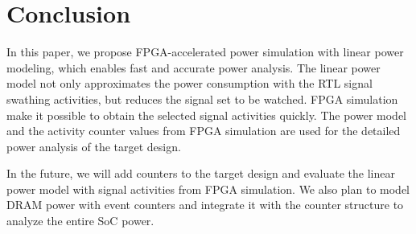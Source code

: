 \section{Conclusion}
In this paper, we propose FPGA-accelerated power simulation with linear power modeling,
which enables fast and accurate power analysis.
The linear power model not only approximates the power consumption with the RTL signal swathing activities,
but reduces the signal set to be watched. 
FPGA simulation make it possible to obtain the selected signal activities quickly.
The power model and the activity counter values from FPGA simulation are used for the detailed power analysis of the target design.

In the future, we will add counters to the target design and evaluate the linear power model with signal activities from FPGA simulation. 
We also plan to model DRAM power with event counters and integrate it with the counter structure to analyze the entire SoC power.